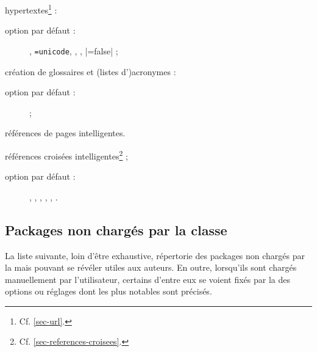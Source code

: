 \documentclass[french,nolocaltoc]{nwejmart}
\newtheorem[title=Fait,style=definition]{fact}
\begin{document}
\begin{description}
  hypertextes\footnote{Cf. \vref{sec-url}.} :
  \begin{description}
  \item[option par défaut :] ,
    \lstinline[alsolanguage={[hyperref]TeX}]|=unicode|,
    , ,
    |=false| ;
  \end{description}
\item[\package{glossaries} :] création de glossaires et (listes d')acronymes :
  \begin{description}
  \item[option par défaut :]  ;
  \end{description}
\item[\package{varioref} :] références de pages intelligentes.
\item[\package{cleveref} :] références croisées
  intelligentes\footnote{Cf. \vref{sec-references-croisees}.} ;
  \begin{description}
  \item[option par défaut :] , ,
    , , ,
    .
  \end{description}
\end{description}

\subsection{Packages non  chargés par la classe}\label{sec:packages-non-charges}

La liste suivante, loin d'être exhaustive, répertorie des packages non chargés
par la \nwejmauthorcl{} mais pouvant se révéler utiles aux auteurs.  En outre,
lorsqu'ils sont chargés manuellement par l'utilisateur, certains d'entre eux se
voient fixés par la \nwejmauthorcl{} des options ou réglages dont les plus
notables sont précisés.
\end{document}
